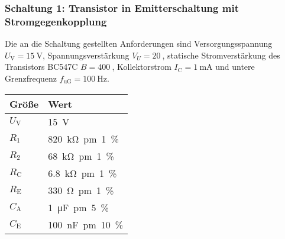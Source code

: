 \subsubsection*{Schaltung 1: Transistor in Emitterschaltung mit Stromgegenkopplung}
%
Die an die Schaltung gestellten Anforderungen sind Versorgungsspannung $U_{\text{V}} = \SI{15}{\volt}$, Spannungsverstärkung $V_U = \SI{20}{}$, statische Stromverstärkung des Transistors BC547C $B = \SI{400}{}$, Kollektorstrom $I_{\text{C}} = \SI{1}{\milli\ampere}$ und untere Grenzfrequenz $f_{\text{uG}} = \SI{100}{\hertz}$.
%
\par
%
\minipage{\linewidth}
    \begin{center}
        \captionsetup{type=table}
        \begin{adjustbox}{max width=\linewidth, keepaspectratio}
            \begin{tabular}{ll}
            \toprule
            Größe & Wert \\
            \midrule
            $U_{\text{V}}$ & \SI{15}{\volt} \\
            $R_1$ & \SI{820}{\kilo\ohm \pm 1 \percent} \\
            $R_2$ & \SI{68}{\kilo\ohm \pm 1 \percent} \\
            $R_{\text{C}}$ & \SI{6,8}{\kilo\ohm \pm 1 \percent} \\
            $R_{\text{E}}$ & \SI{330}{\ohm \pm 1 \percent} \\
            $C_{\text{A}}$ & \SI{1}{\micro\farad \pm 5 \percent} \\
            $C_{\text{E}}$ & \SI{100}{\nano\farad \pm 10 \percent} \\
            \bottomrule
            \end{tabular}
        \end{adjustbox}
        \label{tab:DimensionierungEmitterschaltung}
    \end{center}
\endminipage
%
